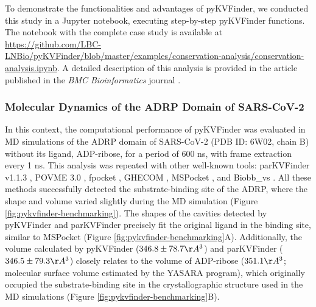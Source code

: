 \documentclass[Ingles]{phdthesis}
\begin{document}
To demonstrate the functionalities and advantages of pyKVFinder, we conducted this study in a Jupyter notebook, executing step-by-step pyKVFinder functions. The notebook with the complete case study is available at \url{https://github.com/LBC-LNBio/pyKVFinder/blob/master/examples/conservation-analysis/conservation-analysis.ipynb}. A detailed description of this analysis is provided in the article published in the \textit{BMC Bioinformatics} journal \cite{guerra2021}.

\subsubsection{Molecular Dynamics of the ADRP Domain of SARS-CoV-2}

In this context, the computational performance of pyKVFinder was evaluated in \acs{MD} simulations of the ADRP domain of SARS-CoV-2 (PDB ID: 6W02, chain B) without its ligand, ADP-ribose, for a period of 600 ns, with frame extraction every 1 ns. This analysis was repeated with other well-known tools: parKVFinder v1.1.3 \cite{guerra2020}, POVME 3.0 \cite{povme}, fpocket \cite{fpocket}, GHECOM \cite{ghecom}, MSPocket \cite{mspocket}, and Biobb\_vs \cite{biobbvs}. All these methods successfully detected the substrate-binding site of the ADRP, where the shape and volume varied slightly during the MD simulation (Figure \ref{fig:pykvfinder-benchmarking}). The shapes of the cavities detected by pyKVFinder and parKVFinder precisely fit the original ligand in the binding site, similar to MSPocket (Figure \ref{fig:pykvfinder-benchmarking}A). Additionally, the volume calculated by pyKVFinder ($346.8 \pm 78.7 \AA^3$) and parKVFinder ($346.5 \pm 79.3 \AA^3$) closely relates to the volume of ADP-ribose ($351.1 \AA^3$; molecular surface volume estimated by the YASARA program), which originally occupied the substrate-binding site in the crystallographic structure used in the MD simulations (Figure \ref{fig:pykvfinder-benchmarking}B).
\end{document}
